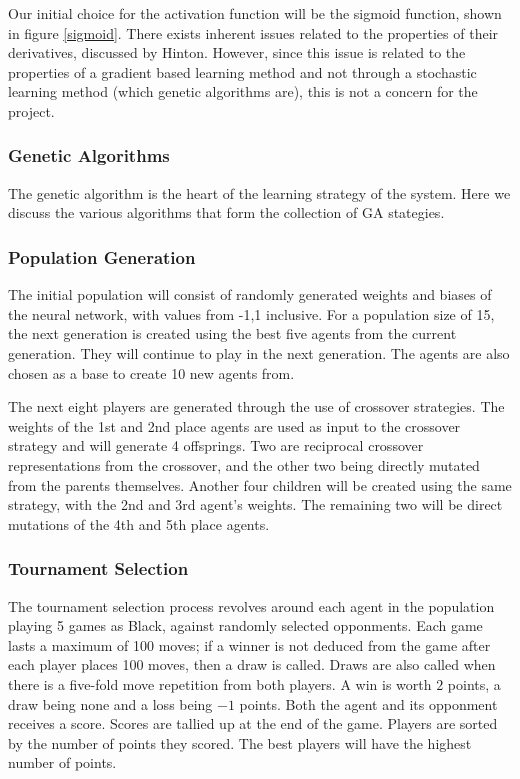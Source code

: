 \documentclass[12pt,a4paper]{article}
\begin{document}
    
    Our initial choice for the activation function will be the sigmoid function, shown in figure \ref{sigmoid}. There exists inherent issues related to the properties of their derivatives, discussed by Hinton. However, since this issue is related to the properties of a gradient based learning method and not through a stochastic learning method (which genetic algorithms are), this is not a concern for the project.

\subsubsection{Genetic Algorithms} 

    The genetic algorithm is the heart of the learning strategy of the system. Here we discuss the various algorithms that form the collection of GA stategies.

\subsubsection{Population Generation}

    The initial population will consist of randomly generated weights and biases of the neural network, with values from -1,1 inclusive. For a population size of 15, the next generation is created using the best five agents from the current generation. They will continue to play in the next generation. The agents are also chosen as a base to create 10 new agents from.

    The next eight players are generated through the use of crossover strategies. The weights of the 1st and 2nd place agents are used as input to the crossover strategy and will generate 4 offsprings. Two are reciprocal crossover representations from the crossover, and the other two being directly mutated from the parents themselves. Another four children will be created using the same strategy, with the 2nd and 3rd agent's weights.
    The remaining two will be direct mutations of the 4th and 5th place agents.

\subsubsection{Tournament Selection}

    The tournament selection process revolves around each agent in the population playing 5 games as Black, against randomly selected opponments. Each game lasts a maximum of 100 moves; if a winner is not deduced from the game after each player places 100 moves, then a draw is called. Draws are also called when there is a five-fold move repetition from both players. A win is worth $2$ points, a draw being none and a loss being $-1$ points. Both the agent and its opponment receives a score. Scores are tallied up at the end of the game. Players are sorted by the number of points they scored. The best players will have the highest number of points.
\end{document}

